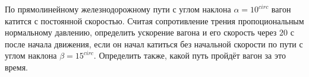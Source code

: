 По прямолинейному железнодорожному пути с углом наклона
$\alpha=10^{circ}$ вагон катится с постоянной скоростью.
Считая сопротивление трения пропоциональным нормальному давлению,
определить ускорение вагона и его скорость через $20$ с после начала
движения, если он начал катиться без начальной скорости по пути
с углом наклона $\beta=15^{circ}$. Определить также, какой путь пройдёт
вагон за это время.
